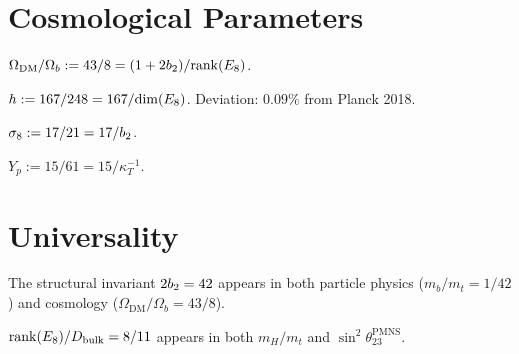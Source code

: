 \section{Cosmological Parameters}

\begin{definition}\label{def:DM_b}
    \leanok
    $\Omega_{\mathrm{DM}} / \Omega_b := 43/8 = (1 + 2b_2) / \mathrm{rank}(E_8)$.
\end{definition}

\begin{definition}\label{def:hubble_h}
    \leanok
    $h := 167/248 = 167/\mathrm{dim}(E_8)$.
    Deviation: $0.09\%$ from Planck 2018.
\end{definition}

\begin{definition}[$\sigma_8$]\label{def:sigma8}
    \leanok
    $\sigma_8 := 17/21 = 17/b_2$.
\end{definition}

\begin{definition}\label{def:Yp}
    \leanok
    $Y_p := 15/61 = 15/\kappa_T^{-1}$.
\end{definition}

\section{Universality}

\begin{theorem}\label{thm:42_universality}
    \leanok
    The structural invariant $2b_2 = 42$ appears in both particle physics
    ($m_b/m_t = 1/42$) and cosmology ($\Omega_{\mathrm{DM}}/\Omega_b = 43/8$).
\end{theorem}

\begin{theorem}[8/11 Universality]\label{thm:8_11_universality}
    \leanok
    $\mathrm{rank}(E_8)/D_{\mathrm{bulk}} = 8/11$ appears in both $m_H/m_t$ and $\sin^2\theta_{23}^{\mathrm{PMNS}}$.
\end{theorem}


